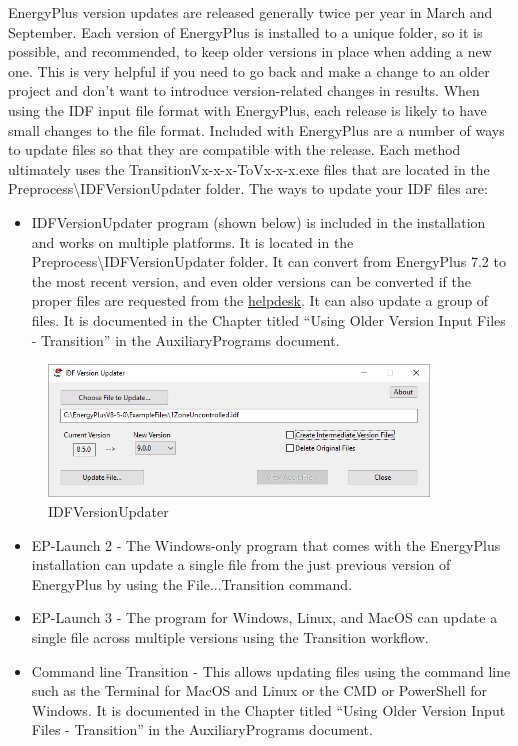 EnergyPlus version updates are released generally twice per year in
March and September. Each version of EnergyPlus is installed to a
unique folder, so it is possible, and recommended, to keep older versions
in place when adding a new one. This is very helpful if you need to
go back and make a change to an older project and don't want to introduce
version-related changes in results. When using the IDF input file
format with EnergyPlus, each release is likely to have small changes
to the file format. Included with EnergyPlus are a number of ways
to update files so that they are compatible with the release. Each
method ultimately uses the TransitionVx-x-x-ToVx-x-x.exe files that
are located in the Preprocess\textbackslash IDFVersionUpdater folder.
The ways to update your IDF files are:
\begin{itemize}
\item IDFVersionUpdater program (shown below) is included in the installation
and works on multiple platforms. It is located in the Preprocess\textbackslash IDFVersionUpdater
folder. It can convert from EnergyPlus 7.2 to the most recent version,
and even older versions can be converted if the proper files are requested
from the \href{https://energyplushelp.freshdesk.com/}{helpdesk}.
It can also update a group of files. It is documented in the Chapter
titled ``Using Older Version Input Files - Transition'' in the AuxiliaryPrograms
document.
\end{itemize}

\begin{figure}[hbtp]
\centering
\includegraphics[width=0.9\textwidth, height=0.9\textheight, keepaspectratio=true]{media/IDFVersionUpdater.png}
\caption{IDFVersionUpdater}
\end{figure}

\begin{itemize}
\item EP-Launch 2 - The Windows-only program that comes with the EnergyPlus
installation can update a single file from the just previous version
of EnergyPlus by using the File...Transition command.
\item EP-Launch 3 - The program for Windows, Linux, and MacOS can update
a single file across multiple versions using the Transition workflow.
\item Command line Transition - This allows updating files using the command
line such as the Terminal for MacOS and Linux or the CMD or PowerShell
for Windows. It is documented in the Chapter titled ``Using Older
Version Input Files - Transition'' in the AuxiliaryPrograms document.
\end{itemize}

